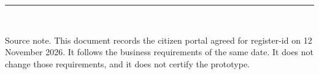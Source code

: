 \documentclass[11pt]{article}
\begin{document}
\vspace{1.1em}
{\color{rule}\rule{\textwidth}{0.4pt}}\\[0.45em]
{\small\color{muted}
Source note. This document records the citizen portal agreed for register-id on 12 November 2026. It follows the business requirements of the same date. It does not change those requirements, and it does not certify the prototype.\par
}
\end{document}
